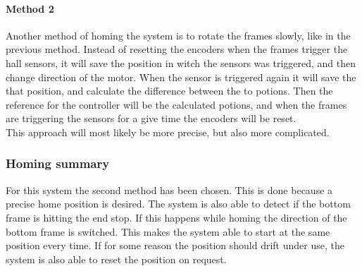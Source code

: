 \documentclass[../../../main]{subfiles}
\begin{document}
\paragraph{Method 2}%
\label{par:method_2}
Another method of homing the system is to rotate the frames slowly, like in the previous method. 
Instead of resetting the encoders when the frames trigger the hall sensors, it will save the position in witch the sensors was triggered, and then change direction of the motor.
When the sensor is triggered again it will save the that position, and calculate the difference between the to potions. 
Then the reference for the controller will be the calculated potions, and when the frames are triggering the sensors for a give time the encoders will be reset.
\\
This approach will most likely be more precise, but also more complicated. 



\subsubsection{Homing summary}%
\label{ssub:homing_summary}
For this system the second method has been chosen. This is done because a precise home position is desired.
The system is also able to detect if the bottom frame is hitting the end stop. If this happens while homing the direction of the bottom frame is switched.
This makes the system able to start at the same position every time.
If for some reason the position should drift under use, the system is also able to reset the position on request.
\end{document}
